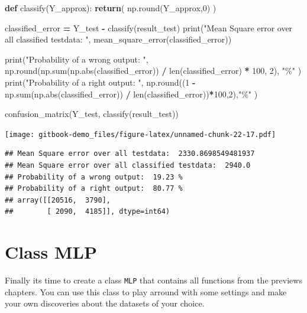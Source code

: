 \documentclass[
]{book}
\newenvironment{Shaded}{\begin{snugshade}}{\end{snugshade}}
\newcommand{\BuiltInTok}[1]{#1}
\newcommand{\ControlFlowTok}[1]{\textcolor[rgb]{0.13,0.29,0.53}{\textbf{#1}}}
\newcommand{\DecValTok}[1]{\textcolor[rgb]{0.00,0.00,0.81}{#1}}
\newcommand{\KeywordTok}[1]{\textcolor[rgb]{0.13,0.29,0.53}{\textbf{#1}}}
\newcommand{\NormalTok}[1]{#1}
\newcommand{\OperatorTok}[1]{\textcolor[rgb]{0.81,0.36,0.00}{\textbf{#1}}}
\newcommand{\StringTok}[1]{\textcolor[rgb]{0.31,0.60,0.02}{#1}}
\begin{document}
\begin{Shaded}
\begin{Highlighting}[]
\KeywordTok{def}\NormalTok{ classify(Y\_approx):}
  \ControlFlowTok{return}\NormalTok{( np.}\BuiltInTok{round}\NormalTok{(Y\_approx,}\DecValTok{0}\NormalTok{) )}

\NormalTok{classified\_error }\OperatorTok{=}\NormalTok{ Y\_test }\OperatorTok{{-}}\NormalTok{ classify(result\_test)}
\BuiltInTok{print}\NormalTok{(}\StringTok{"Mean Square error over all classified testdata: "}\NormalTok{, mean\_square\_error(classified\_error))}

\BuiltInTok{print}\NormalTok{(}\StringTok{"Probability of a wrong output: "}\NormalTok{, np.}\BuiltInTok{round}\NormalTok{(np.}\BuiltInTok{sum}\NormalTok{(np.}\BuiltInTok{abs}\NormalTok{(classified\_error)) }\OperatorTok{/} \BuiltInTok{len}\NormalTok{(classified\_error) }\OperatorTok{*} \DecValTok{100}\NormalTok{, }\DecValTok{2}\NormalTok{), }\StringTok{"\%"}\NormalTok{ )}
\BuiltInTok{print}\NormalTok{(}\StringTok{"Probability of a right output: "}\NormalTok{, np.}\BuiltInTok{round}\NormalTok{((}\DecValTok{1} \OperatorTok{{-}}\NormalTok{ np.}\BuiltInTok{sum}\NormalTok{(np.}\BuiltInTok{abs}\NormalTok{(classified\_error)) }\OperatorTok{/} \BuiltInTok{len}\NormalTok{(classified\_error))}\OperatorTok{*}\DecValTok{100}\NormalTok{,}\DecValTok{2}\NormalTok{),}\StringTok{"\%"}\NormalTok{ )}


\NormalTok{confusion\_matrix(Y\_test, classify(result\_test))}
\end{Highlighting}
\end{Shaded}

\texttt{[image: gitbook-demo\_files/figure-latex/unnamed-chunk-22-17.pdf]}

\begin{verbatim}
## Mean Square error over all testdata:  2330.8698549481937
## Mean Square error over all classified testdata:  2940.0
## Probability of a wrong output:  19.23 %
## Probability of a right output:  80.77 %
## array([[20516,  3790],
##        [ 2090,  4185]], dtype=int64)
\end{verbatim}

\hypertarget{class-mlp}{%
\chapter{Class MLP}\label{class-mlp}}

Finally its time to create a class \texttt{MLP} that contains all functions from the previews chapters. You can use this class to play arround with some settings and make your own discoveries about the datasets of your choice.
\end{document}
